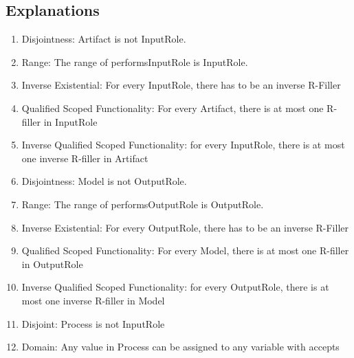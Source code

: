 \subsection{Explanations}
\label{exp:1a}
\begin{enumerate}
    \item  Disjointness: \textsf{Artifact} is not \textsf{InputRole}.
    \item  Range: The range of \textsf{performsInputRole} is \textsf{InputRole}. 
    \item   Inverse Existential: For every \textsf{InputRole}, there has to be an inverse R-Filler %
    \item  Qualified Scoped Functionality: For every \textsf{Artifact}, there is at most one R-filler in \textsf{InputRole} %
    \item  Inverse Qualified Scoped Functionality: for every \textsf{InputRole}, there is at most one inverse R-filler in \textsf{Artifact} %
    \item  Disjointness: \textsf{Model} is not \textsf{OutputRole}.
    \item  Range: The range of \textsf{performsOutputRole} is \textsf{OutputRole}. 
    \item   Inverse Existential: For every \textsf{OutputRole}, there has to be an inverse R-Filler %
    \item  Qualified Scoped Functionality: For every \textsf{Model}, there is at most one R-filler in \textsf{OutputRole} %
    \item  Inverse Qualified Scoped Functionality: for every \textsf{OutputRole}, there is at most one inverse R-filler in \textsf{Model} %
    \item Disjoint: \textsf{Process} is not \textsf{InputRole}  %
    \item Domain: Any value in \textsf{Process} can be assigned to any variable with \textsf{accepts} %

\end{enumerate}
